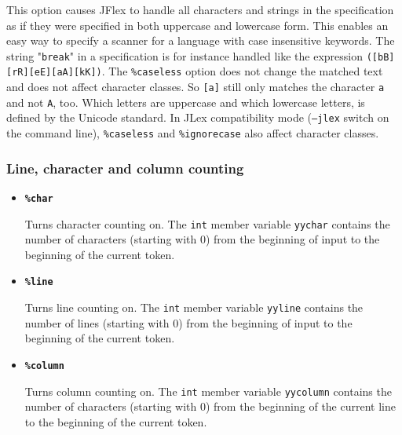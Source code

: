 \documentclass[11pt]{scrartcl}
\begin{document}
\begin{itemize}
This option causes JFlex to handle all characters and strings in the
specification as if they were specified in both uppercase and lowercase form.
This enables an easy way to specify a scanner for a language with case
insensitive keywords. The string "\texttt{break}" in a specification is for
instance handled like the expression \texttt{([bB][rR][eE][aA][kK])}. The
\texttt{\%caseless} option does not change the matched text and does not
affect character classes. So \texttt{[a]} still only matches the character
\texttt{a} and not \texttt{A}, too. Which letters are uppercase and which
lowercase letters, is defined by the Unicode standard. In JLex compatibility
mode (\texttt{--jlex} switch on the command line), \texttt{\%caseless}
and \texttt{\%ignorecase} also affect character classes.

 \end{itemize}
\subsubsection{Line, character and column counting\label{Counting}}
\begin{itemize}
\item
{\bf \texttt{\%char}}

Turns character counting on. The \texttt{int} member variable \texttt{yychar}
contains the number of characters (starting with 0) from the beginning
of input to the beginning of the current token.
 
\item
{\bf \texttt{\%line}}

Turns line counting on. The \texttt{int} member variable \texttt{yyline}
contains the number of lines (starting with 0) from the beginning of input
to the beginning of the current token.
 
\item
{\bf \texttt{\%column}}

Turns column counting on. The \texttt{int} member variable \texttt{yycolumn}
contains the number of characters (starting with 0) from the beginning
of the current line to the beginning of the current token.

 \end{itemize}
\end{document}
